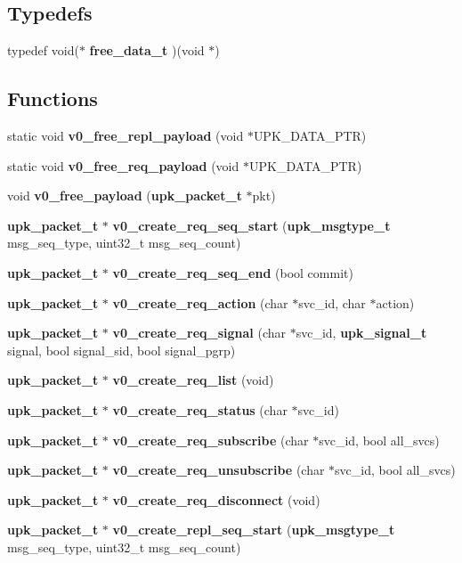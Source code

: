 \subsection*{Typedefs}
\begin{DoxyCompactItemize}
\item 
typedef void($\ast$ {\bf free\_\-data\_\-t} )(void $\ast$)
\end{DoxyCompactItemize}
\subsection*{Functions}
\begin{DoxyCompactItemize}
\item 
static void {\bf v0\_\-free\_\-repl\_\-payload} (void $\ast$UPK\_\-DATA\_\-PTR)
\item 
static void {\bf v0\_\-free\_\-req\_\-payload} (void $\ast$UPK\_\-DATA\_\-PTR)
\item 
void {\bf v0\_\-free\_\-payload} ({\bf upk\_\-packet\_\-t} $\ast$pkt)
\item 
{\bf upk\_\-packet\_\-t} $\ast$ {\bf v0\_\-create\_\-req\_\-seq\_\-start} ({\bf upk\_\-msgtype\_\-t} msg\_\-seq\_\-type, uint32\_\-t msg\_\-seq\_\-count)
\item 
{\bf upk\_\-packet\_\-t} $\ast$ {\bf v0\_\-create\_\-req\_\-seq\_\-end} (bool commit)
\item 
{\bf upk\_\-packet\_\-t} $\ast$ {\bf v0\_\-create\_\-req\_\-action} (char $\ast$svc\_\-id, char $\ast$action)
\item 
{\bf upk\_\-packet\_\-t} $\ast$ {\bf v0\_\-create\_\-req\_\-signal} (char $\ast$svc\_\-id, {\bf upk\_\-signal\_\-t} signal, bool signal\_\-sid, bool signal\_\-pgrp)
\item 
{\bf upk\_\-packet\_\-t} $\ast$ {\bf v0\_\-create\_\-req\_\-list} (void)
\item 
{\bf upk\_\-packet\_\-t} $\ast$ {\bf v0\_\-create\_\-req\_\-status} (char $\ast$svc\_\-id)
\item 
{\bf upk\_\-packet\_\-t} $\ast$ {\bf v0\_\-create\_\-req\_\-subscribe} (char $\ast$svc\_\-id, bool all\_\-svcs)
\item 
{\bf upk\_\-packet\_\-t} $\ast$ {\bf v0\_\-create\_\-req\_\-unsubscribe} (char $\ast$svc\_\-id, bool all\_\-svcs)
\item 
{\bf upk\_\-packet\_\-t} $\ast$ {\bf v0\_\-create\_\-req\_\-disconnect} (void)
\item 
{\bf upk\_\-packet\_\-t} $\ast$ {\bf v0\_\-create\_\-repl\_\-seq\_\-start} ({\bf upk\_\-msgtype\_\-t} msg\_\-seq\_\-type, uint32\_\-t msg\_\-seq\_\-count)

\end{DoxyCompactItemize}
